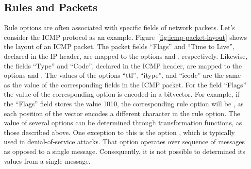 \documentclass[sigconf,review, anonymous]{acmart}
\begin{document}
  

\subsection{Rules and Packets}
\label{sec:rules-and-packets}

Rule options are often associated with specific fields of network
packets. Let's consider the ICMP protocol as an
example. Figure~\ref{fig:icmp-packet-layout} shows the layout of an
ICMP packet. The packet fields ``Flags'' and ``Time to Live'',
declared in the IP header, are mapped to the options 
and , respectively. Likewise, the fields ``Type'' and
``Code'', declared in the ICMP header, are mapped to the options
 and . The values of the options ``ttl'',
``itype'', and ``icode'' are the same as the value of the
corresponding fields in the ICMP packet. For the field ``Flags'' the
value of the corresponding option is encoded in a bitvector. For
example, if the ``Flags'' field stores the value 1010, the
corresponding rule option will be , as each
position of the vector encodes a different character in the
 rule option. The value of several options can be
determined through transformation functions, as those described
above. One exception to this is the option , which
is typically used in denial-of-service attacks. That option operates
over sequence of messages as opposed to a single
message. Consequently, it is not possible to determined its values
from a single message.
\end{document}
